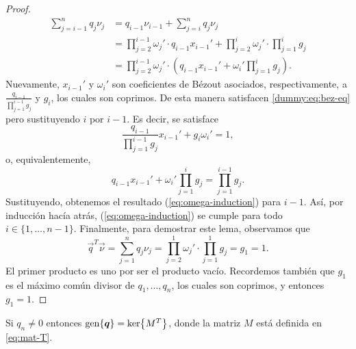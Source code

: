 \begin{proof}
\begin{align*}
		\sum_{j=i-1}^{n}q_j\nu_j
		&= q_{i-1}\nu_{i-1} + \sum_{j=i}^{n}q_j\nu_j \\
		&= \prod_{j=2}^{i-1}\omega_j' \cdot q_{i-1}x_{i-1}' + \prod_{j=2}^{i}\omega_j' \cdot
		\prod_{j=1}^{i}g_j \\
		&= \prod_{j=2}^{i-1}\omega_j' \cdot \left( q_{i-1}x_{i-1}' + \omega_i'
			\prod_{j=1}^{i}g_j \right).
	\end{align*}
	Nuevamente, $x_{i-1}'$ y $\omega_i'$ son coeficientes de Bézout asociados, respectivamente, a
	$\frac{q_{i-1}}{\prod_{j=1}^{i-1}g_j}$ y $g_i$, los cuales son coprimos. De esta manera
	satisfacen \eqref{dummy:eq:bez-eq} pero sustituyendo $i$ por $i - 1$. Es decir, se satisface
	\begin{equation*}
		\frac{q_{i-1}}{\prod_{j=1}^{i-1}g_j}x_{i-1}' +
		g_i \omega_i' = 1,
	\end{equation*}
	o, equivalentemente,
	\begin{equation*}
		q_{i-1}x_{i-1}' + \omega_i'\prod_{j=1}^{i}g_j = \prod_{j=1}^{i-1}g_j.
	\end{equation*}
	Sustituyendo, obtenemos el resultado (\ref{eq:omega-induction}) para $i - 1$. Así, por inducción
	hacía atrás, (\ref{eq:omega-induction}) se cumple para todo $i \in \lbrace 1, \ldots, n - 1
	\rbrace$. Finalmente, para demostrar este lema, observamos que
	\begin{equation*}
		\vec{q}^T\vec{\nu} = \sum_{j=1}^{n}q_j\nu_j = \prod_{j=2}^{1}\omega_j'
		\cdot \prod_{j=1}^{1}g_j = g_1 = 1.
	\end{equation*}
	El primer producto es uno por ser el producto vacío. Recordemos también que $g_1$ es el máximo
	común divisor de $q_1, \ldots, q_n$, los cuales son coprimos, y entonces $g_1 = 1$.
\end{proof}
\begin{lemma}
	\label{lemma:iso2}
	Si $q_n \neq 0$ entonces $\operatorname{gen}\lbrace \boldsymbol{q} \rbrace = \mathop{\mathrm{ker}{\left\lbrace M^T \right\rbrace}}$, donde la matriz $M$ está
	definida en \eqref{eq:mat-T}.
\end{lemma}
